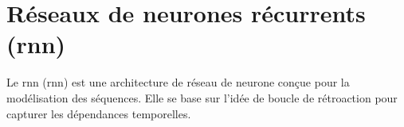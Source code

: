 \section{Réseaux de neurones récurrents (\acrshort{rnn})}
\label{seq:rnn}

Le \acrshort{rnn} (\Acrlong{rnn}) est une architecture de réseau de neurone 
conçue pour la modélisation des séquences.
Elle se base sur l'idée de boucle de rétroaction pour capturer les dépendances temporelles.


